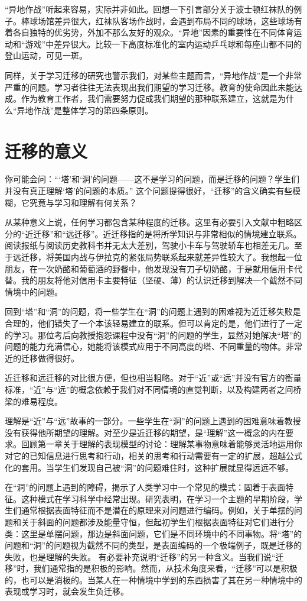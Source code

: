 “异地作战”听起来容易，实际并非如此。回想一下引言部分关于波士顿红袜队的例子。棒球场馆差异很大，红袜队客场作战时，会遇到布局不同的球场，这些球场有着各自独特的优劣势，外加不那么友好的观众。“异地”因素的重要性在不同体育运动和“游戏”中差异很大。比较一下高度标准化的室内运动乒乓球和每座山都不同的登山运动，可见一斑。

同样，关于学习迁移的研究也警示我们，对某些主题而言，“异地作战”是一个非常严重的问题。学习者往往无法表现出我们期望的学习迁移。教育的使命因此未能达成。作为教育工作者，我们需要努力促成我们期望的那种联系建立，这就是为什么“异地作战”是整体学习的第四条原则。

\section*{迁移的意义}

你可能会问：“‘塔’和‘洞’的问题——这不是学习的问题，而是迁移的问题？学生们并没有真正理解‘塔’的问题的本质。” 这个问题提得很好，“迁移”的含义确实有些模糊，它究竟与学习和理解有何关系？

从某种意义上说，任何学习都包含某种程度的迁移。这里有必要引入文献中粗略区分的“近迁移”和“远迁移”。近迁移指的是将所学知识与非常相似的情境建立联系。阅读报纸与阅读历史教科书并无太大差别，驾驶小卡车与驾驶轿车也相差无几。至于远迁移，将美国内战与伊拉克的紧张局势联系起来就差异性较大了。我想起一位朋友，在一次奶酪和葡萄酒的野餐中，他发现没有刀子切奶酪，于是就用信用卡代替。我的朋友将他对信用卡主要特征（坚硬、薄）的认识迁移到解决一个截然不同情境中的问题。

回到“塔”和“洞”的问题，将一些学生在“洞”的问题上遇到的困难视为近迁移失败是合理的，他们错失了一个本该轻易建立的联系。但可以肯定的是，他们进行了一定的学习。那位考后向教授抱怨课程中没有“洞”的问题的学生，显然对她解决“塔”的问题的能力充满信心，她能将该模式应用于不同高度的塔、不同重量的物体。非常近的迁移做得很好。

近迁移和远迁移的对比很方便，但也相当粗略。对于“近”或“远”并没有官方的衡量标准，“近”与“远”的概念依赖于我们对不同情境的直觉判断，以及构建两者之间桥梁的难易程度。

理解是“近”与“远”故事的一部分。一些学生在“洞”的问题上遇到的困难意味着教授没有获得他所期望的理解。对至少是近迁移的期望，是“理解”这一概念的内在要求。回顾第一章关于理解的表现模型的讨论：理解某事物意味着能够灵活地运用你对它的已知信息进行思考和行动，相关的思考和行动需要有一定的扩展，超越公式化的套用。当学生们发现自己被“洞”的问题难住时，这种扩展就显得远远不够。

在“洞”的问题上遇到的障碍，揭示了人类学习中一个常见的模式：固着于表面特征。这种模式在学习科学中经常出现。研究表明，在学习一个主题的早期阶段，学生们通常根据表面特征而不是潜在的原理来对问题进行编码。例如，关于单摆的问题和关于斜面的问题都涉及能量守恒，但起初学生们根据表面特征对它们进行分类：这里是单摆问题，那边是斜面问题，它们是不同环境中的不同事物。将“塔”的问题和“洞”的问题视为截然不同的类型，是表面编码的一个极端例子，既是迁移的失败，也是理解的失败。
有必要补充说明“迁移”的另一种含义。当我们说“迁移”时，我们通常指的是积极的影响。然而，从技术角度来看，“迁移”可以是积极的，也可以是消极的。当某人在一种情境中学到的东西损害了其在另一种情境中的表现或学习时，就会发生负迁移。

